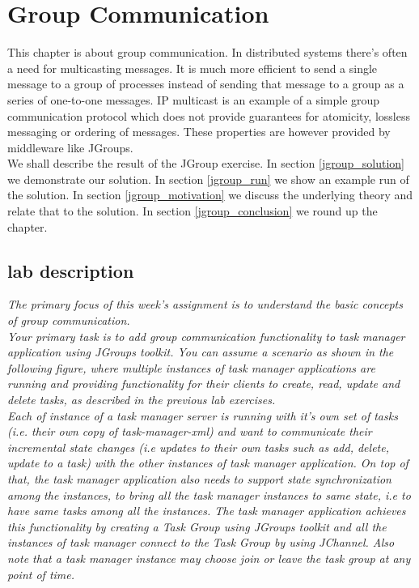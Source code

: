 \chapter{Group Communication}
\minitoc


This chapter is about group communication. In distributed systems there's often a need for multicasting messages. It is much more efficient to send a single message to a group of processes instead of sending that message to a group as a series of one-to-one messages. IP multicast is an example of a simple group communication protocol which does not provide guarantees for atomicity, lossless messaging or ordering of messages. These properties are however provided by middleware like JGroups.  \\

We shall describe the result of the JGroup exercise. In section \ref{jgroup_solution} we demonstrate our solution. In section \ref{jgroup_run} we show an example run of the solution. In section \ref{jgroup_motivation} we discuss the underlying theory and relate that to the solution. In section \ref{jgroup_conclusion} we round up the chapter.


\section{lab description}

\textit{The primary focus of this week's assignment is to understand the basic concepts of group communication.} \\

\textit{Your primary task is to add group communication functionality to task manager application using JGroups toolkit. You can assume a scenario as shown in the following figure, where multiple instances of task manager applications are running and providing functionality for their clients to create, read, update and delete tasks, as described in the previous lab exercises.}\\

\textit{Each of instance of a task manager server is running with it's own set of tasks (i.e. their own copy of task-manager-xml) and want to communicate their incremental state changes (i.e updates to their own tasks such as add, delete, update to a task) with the other instances of task manager application.  On top of that, the task manager application also needs to support state synchronization among the instances, to bring all the task manager instances to same state, i.e to have same tasks among all the instances. The task manager application  achieves this functionality by creating a Task Group using JGroups toolkit and all the instances of task manager connect to the Task Group by using JChannel. Also note that a task manager instance may choose join or leave the task group at any point of time.}\\

